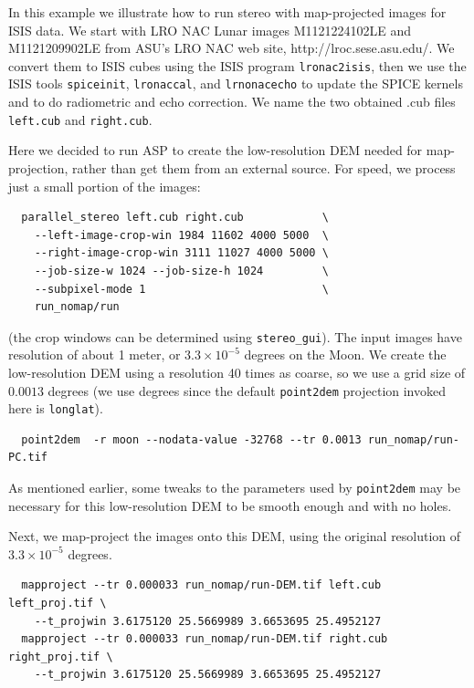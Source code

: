 In this example we illustrate how to run stereo with map-projected
images for ISIS data. We start with LRO NAC Lunar images M1121224102LE
and M1121209902LE from ASU's LRO NAC web site,
http://lroc.sese.asu.edu/. We convert them to ISIS cubes using the ISIS
program \texttt{lronac2isis}, then we use the ISIS tools
\texttt{spiceinit}, \texttt{lronaccal}, and \texttt{lrnonacecho} to
update the SPICE kernels and to do radiometric and echo correction. We
name the two obtained .cub files \texttt{left.cub} and
\texttt{right.cub}.

Here we decided to run ASP to create the low-resolution DEM needed for
map-projection, rather than get them from an external source. For speed,
we process just a small portion of the images:

\begin{verbatim}
  parallel_stereo left.cub right.cub            \
    --left-image-crop-win 1984 11602 4000 5000  \
    --right-image-crop-win 3111 11027 4000 5000 \
    --job-size-w 1024 --job-size-h 1024         \
    --subpixel-mode 1                           \
    run_nomap/run
\end{verbatim}

(the crop windows can be determined using \texttt{stereo\_gui}). 
The input images have resolution of about 1 meter, or $3.3 \times
10^{-5}$ degrees on the Moon. We create the low-resolution DEM using a
resolution 40 times as coarse, so we use a grid size of $0.0013$ degrees
(we use degrees since the default \texttt{point2dem} projection invoked
here is \texttt{longlat}).

\begin{verbatim}
  point2dem  -r moon --nodata-value -32768 --tr 0.0013 run_nomap/run-PC.tif
\end{verbatim}

As mentioned earlier, some tweaks to the parameters used by \texttt{point2dem}
may be necessary for this low-resolution DEM to be smooth enough and
with no holes.

Next, we map-project the images onto this DEM, using the original resolution
of $3.3 \times 10^{-5}$ degrees.

\begin{verbatim}
  mapproject --tr 0.000033 run_nomap/run-DEM.tif left.cub left_proj.tif \
    --t_projwin 3.6175120 25.5669989 3.6653695 25.4952127
  mapproject --tr 0.000033 run_nomap/run-DEM.tif right.cub right_proj.tif \
    --t_projwin 3.6175120 25.5669989 3.6653695 25.4952127
\end{verbatim}

